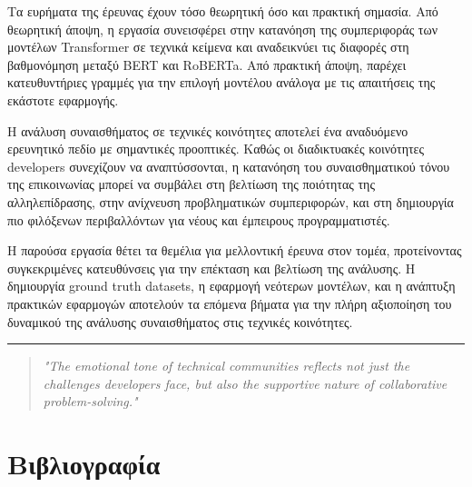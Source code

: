 \documentclass[a4paper,11pt,oneside,openany]{ioniothesis}
\begin{document}
Τα ευρήματα της έρευνας έχουν τόσο θεωρητική όσο και πρακτική σημασία. Από θεωρητική άποψη, η εργασία συνεισφέρει στην κατανόηση της συμπεριφοράς των μοντέλων Transformer σε τεχνικά κείμενα και αναδεικνύει τις διαφορές στη βαθμονόμηση μεταξύ BERT και RoBERTa. Από πρακτική άποψη, παρέχει κατευθυντήριες γραμμές για την επιλογή μοντέλου ανάλογα με τις απαιτήσεις της εκάστοτε εφαρμογής.

Η ανάλυση συναισθήματος σε τεχνικές κοινότητες αποτελεί ένα αναδυόμενο ερευνητικό πεδίο με σημαντικές προοπτικές. Καθώς οι διαδικτυακές κοινότητες developers συνεχίζουν να αναπτύσσονται, η κατανόηση του συναισθηματικού τόνου της επικοινωνίας μπορεί να συμβάλει στη βελτίωση της ποιότητας της αλληλεπίδρασης, στην ανίχνευση προβληματικών συμπεριφορών, και στη δημιουργία πιο φιλόξενων περιβαλλόντων για νέους και έμπειρους προγραμματιστές.

Η παρούσα εργασία θέτει τα θεμέλια για μελλοντική έρευνα στον τομέα, προτείνοντας συγκεκριμένες κατευθύνσεις για την επέκταση και βελτίωση της ανάλυσης. Η δημιουργία ground truth datasets, η εφαρμογή νεότερων μοντέλων, και η ανάπτυξη πρακτικών εφαρμογών αποτελούν τα επόμενα βήματα για την πλήρη αξιοποίηση του δυναμικού της ανάλυσης συναισθήματος στις τεχνικές κοινότητες.

\begin{center}
\rule{0.5\textwidth}{0.4pt}
\end{center}

\begin{quote}
\textit{"The emotional tone of technical communities reflects not just the challenges developers face, but also the supportive nature of collaborative problem-solving."}
\end{quote}


\newpage

\section{Βιβλιογραφία}
\label{sec:Βιβλιογραφία}
\printbibliography[heading=none]






\newpage
\end{document}
